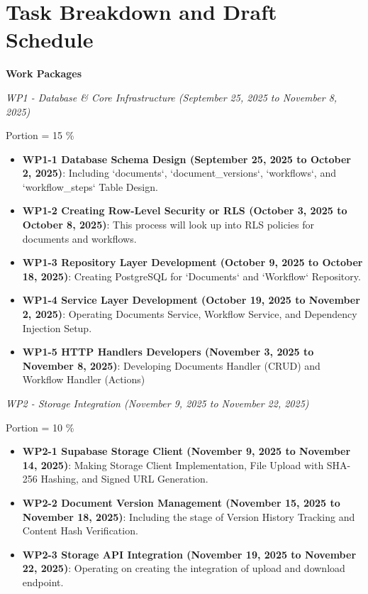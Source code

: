 \documentclass[12pt,oneside,openright,a4paper]{cpe-english-project}
\begin{document}
\vspace{1em}

\section{Task Breakdown and Draft Schedule}

\textbf{Work Packages}

\vspace{1em}

\emph{WP1 - Database \& Core Infrastructure (September 25, 2025 to November 8, 2025)}

Portion = 15 \%

\begin{itemize}
\item \textbf{WP1-1 Database Schema Design (September 25, 2025 to October 2, 2025)}: Including `documents`, `document\_versions`, `workflows`, and `workflow\_steps` Table Design. 
\item \textbf{WP1-2 Creating Row-Level Security or RLS (October 3, 2025 to October 8, 2025)}: This process will look up into RLS policies for documents and workflows.
\item \textbf{WP1-3 Repository Layer Development (October 9, 2025 to October 18, 2025)}: Creating PostgreSQL for `Documents` and `Workflow` Repository.
\item \textbf{WP1-4 Service Layer Development (October 19, 2025 to November 2, 2025)}: Operating Documents Service, Workflow Service, and Dependency Injection Setup.
\item \textbf{WP1-5 HTTP Handlers Developers (November 3, 2025 to November 8, 2025)}: Developing Documents Handler (CRUD) and Workflow Handler (Actions)
\end{itemize}

\vspace{1em}

\emph{WP2 - Storage Integration (November 9, 2025 to November 22, 2025)}

Portion = 10 \% 

\begin{itemize}
\item \textbf{WP2-1 Supabase Storage Client (November 9, 2025 to November 14, 2025)}: Making Storage Client Implementation, File Upload with SHA-256 Hashing, and Signed URL Generation.
\item \textbf{WP2-2 Document Version Management (November 15, 2025 to November 18, 2025)}: Including the stage of Version History Tracking and Content Hash Verification.
\item \textbf{WP2-3 Storage API Integration (November 19, 2025 to November 22, 2025)}: Operating on creating the integration of upload and download endpoint.
\end{itemize}
\end{document}
